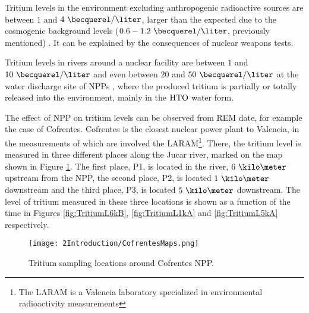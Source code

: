 



Tritium levels in the environment excluding anthropogenic radioactive sources are between $1$ and $4~\becquerel/\liter$, larger than the expected due to the cosmogenic background levels ($0.6-1.2~\becquerel/\liter$, previously mentioned) \cite{FranceTritiumEnvironment}. It can be explained by the consequences of nuclear weapons tests.

Tritium levels in rivers around a nuclear facility are between $1$ and $10~\becquerel/\liter$ and even between $20$ and $50~\becquerel/\liter$ at the water discharge site of NPPs \cite{FranceTritiumEnvironment}, where the produced tritium is partially or totally released into the environment, mainly in the $\ce{HTO}$ water form.

The effect of NPP on tritium levels can be observed from REM date, for example the case of Cofrentes. Cofrentes is the closest nuclear power plant to Valencia, in the measurements of which are involved the LARAM\footnote{The LARAM is a Valencia laboratory specialized in environmental radioactivity measurements}. There, the tritium level is measured in three different places along the Jucar river, marked on the map shown in Figure \ref{fig:SamplingLocations}. The first place, P1, is located in the river, $6~\kilo\meter$ upstream from the NPP, the second place, P2, is located $1~\kilo\meter$ downstream and the third place, P3, is located $5~\kilo\meter$ downstream. The level of tritium measured in these three locations is shown as a function of the time in Figures \ref{fig:TritiumL6kB}, \ref{fig:TritiumL1kA} and \ref{fig:TritiumL5kA} respectively.

\begin{figure}[hbtp]
\texttt{[image: 2Introduction/CofrentesMaps.png]}
\centering
\caption{Tritium sampling locations around Cofrentes NPP.\label{fig:SamplingLocations}}
\end{figure}

